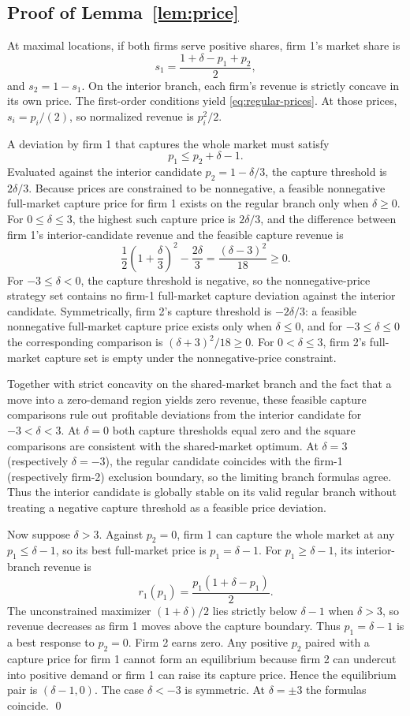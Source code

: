 \subsection{Proof of Lemma~\ref{lem:price}}\label{app:price-proof}

At maximal locations, if both firms serve positive shares, firm 1's market share is
\[
 s_1=\frac{1+\delta-p_1+p_2}{2},
\]
and $s_2=1-s_1$. On the interior branch, each firm's revenue is strictly concave in its own price. The first-order conditions yield \eqref{eq:regular-prices}. At those prices, $s_i=p_i/(2)$, so normalized revenue is $p_i^2/2$.

A deviation by firm 1 that captures the whole market must satisfy
\[
 p_1\leq p_2+\delta-1.
\]
Evaluated against the interior candidate $p_2=1-\delta/3$, the capture threshold is $2\delta/3$. Because prices are constrained to be nonnegative, a feasible nonnegative full-market capture price for firm 1 exists on the regular branch only when $\delta\geq0$. For $0\leq\delta\leq3$, the highest such capture price is $2\delta/3$, and the difference between firm 1's interior-candidate revenue and the feasible capture revenue is
\[
 \frac12\left(1+\frac{\delta}{3}\right)^2-\frac{2\delta}{3}
 =\frac{(\delta-3)^2}{18}\geq0.
\]
For $-3\leq\delta<0$, the capture threshold is negative, so the nonnegative-price strategy set contains no firm-1 full-market capture deviation against the interior candidate. Symmetrically, firm 2's capture threshold is $-2\delta/3$: a feasible nonnegative full-market capture price exists only when $\delta\leq0$, and for $-3\leq\delta\leq0$ the corresponding comparison is $(\delta+3)^2/18\geq0$. For $0<\delta\leq3$, firm 2's full-market capture set is empty under the nonnegative-price constraint.

Together with strict concavity on the shared-market branch and the fact that a move into a zero-demand region yields zero revenue, these feasible capture comparisons rule out profitable deviations from the interior candidate for $-3<\delta<3$. At $\delta=0$ both capture thresholds equal zero and the square comparisons are consistent with the shared-market optimum. At $\delta=3$ (respectively $\delta=-3$), the regular candidate coincides with the firm-1 (respectively firm-2) exclusion boundary, so the limiting branch formulas agree. Thus the interior candidate is globally stable on its valid regular branch without treating a negative capture threshold as a feasible price deviation.

Now suppose $\delta>3$. Against $p_2=0$, firm 1 can capture the whole market at any $p_1\leq\delta-1$, so its best full-market price is $p_1=\delta-1$. For $p_1\geq\delta-1$, its interior-branch revenue is
\[
 r_1(p_1)=\frac{p_1(1+\delta-p_1)}{2}.
\]
The unconstrained maximizer $(1+\delta)/2$ lies strictly below $\delta-1$ when $\delta>3$, so revenue decreases as firm 1 moves above the capture boundary. Thus $p_1=\delta-1$ is a best response to $p_2=0$. Firm 2 earns zero. Any positive $p_2$ paired with a capture price for firm 1 cannot form an equilibrium because firm 2 can undercut into positive demand or firm 1 can raise its capture price. Hence the equilibrium pair is $(\delta-1,0)$. The case $\delta<-3$ is symmetric. At $\delta=\pm3$ the formulas coincide. \qed

